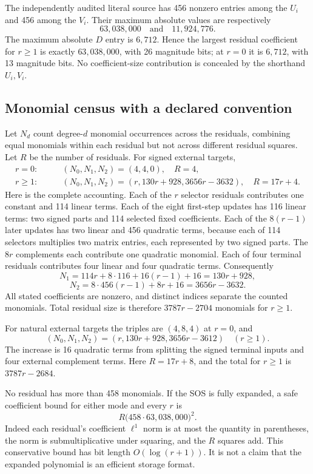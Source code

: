 \documentclass[11pt,letterpaper]{article}
\theoremstyle{definition}
\theoremstyle{remark}
\begin{document}
The independently audited literal source has 456 nonzero entries among the $U_i$ and 456 among the $V_i$. Their maximum absolute values are respectively
\[
 63{,}038{,}000\quad\text{and}\quad11{,}924{,}776.
\]
The maximum absolute $D$ entry is $6{,}712$. Hence the largest residual coefficient for $r\geq1$ is exactly $63{,}038{,}000$, with 26 magnitude bits; at $r=0$ it is $6{,}712$, with 13 magnitude bits. No coefficient-size contribution is concealed by the shorthand $U_i,V_i$.

\subsection{Monomial census with a declared convention}
Let $N_d$ count degree-$d$ monomial occurrences across the residuals, combining equal monomials within each residual but not across different residual squares. Let $R$ be the number of residuals. For signed external targets,
\begin{align}
 r=0:&\qquad (N_0,N_1,N_2)=(4,4,0),\quad R=4,\label{gts:um:eq:mono0}\\
 r\geq1:&\qquad (N_0,N_1,N_2)
     =(r,130r+928,3656r-3632),\quad R=17r+4.\label{gts:um:eq:monor}
\end{align}
Here is the complete accounting. Each of the $r$ selector residuals contributes one constant and 114 linear terms. Each of the eight first-step updates has 116 linear terms: two signed parts and 114 selected fixed coefficients. Each of the $8(r-1)$ later updates has two linear and 456 quadratic terms, because each of 114 selectors multiplies two matrix entries, each represented by two signed parts. The $8r$ complements each contribute one quadratic monomial. Each of four terminal residuals contributes four linear and four quadratic terms. Consequently
\[
 N_1=114r+8\cdot116+16(r-1)+16=130r+928,
\]
\[
 N_2=8\cdot456(r-1)+8r+16=3656r-3632.
\]
All stated coefficients are nonzero, and distinct indices separate the counted monomials. Total residual size is therefore $3787r-2704$ monomials for $r\geq1$.

For natural external targets the triples are $(4,8,4)$ at $r=0$, and
\[
 (N_0,N_1,N_2)=(r,130r+928,3656r-3612)\quad(r\geq1).
\]
The increase is 16 quadratic terms from splitting the signed terminal inputs and four external complement terms. Here $R=17r+8$, and the total for $r\geq1$ is $3787r-2684$.

No residual has more than 458 monomials. If the SOS is fully expanded, a safe coefficient bound for either mode and every $r$ is
\begin{equation}\label{gts:um:eq:coefficient}
 R\bigl(458\cdot63{,}038{,}000\bigr)^2.
\end{equation}
Indeed each residual's coefficient $\ell^1$ norm is at most the quantity in parentheses, the norm is submultiplicative under squaring, and the $R$ squares add. This conservative bound has bit length $O(\log(r+1))$. It is not a claim that the expanded polynomial is an efficient storage format.
\end{document}
